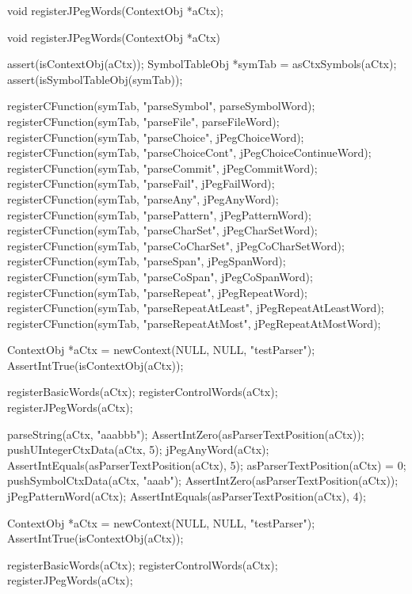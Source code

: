 \startCHeader
void registerJPegWords(ContextObj *aCtx);
\stopCHeader

\startCCode
void registerJPegWords(ContextObj *aCtx) {
  assert(isContextObj(aCtx));
  SymbolTableObj *symTab = asCtxSymbols(aCtx);
  assert(isSymbolTableObj(symTab));
  
  registerCFunction(symTab, "parseSymbol",        parseSymbolWord);
  registerCFunction(symTab, "parseFile",          parseFileWord);
  registerCFunction(symTab, "parseChoice",        jPegChoiceWord);
  registerCFunction(symTab, "parseChoiceCont",    jPegChoiceContinueWord);
  registerCFunction(symTab, "parseCommit",        jPegCommitWord);
  registerCFunction(symTab, "parseFail",          jPegFailWord);
  registerCFunction(symTab, "parseAny",           jPegAnyWord);
  registerCFunction(symTab, "parsePattern",       jPegPatternWord);
  registerCFunction(symTab, "parseCharSet",       jPegCharSetWord);
  registerCFunction(symTab, "parseCoCharSet",     jPegCoCharSetWord);
  registerCFunction(symTab, "parseSpan",          jPegSpanWord);
  registerCFunction(symTab, "parseCoSpan",        jPegCoSpanWord);
  registerCFunction(symTab, "parseRepeat",        jPegRepeatWord);
  registerCFunction(symTab, "parseRepeatAtLeast", jPegRepeatAtLeastWord);
  registerCFunction(symTab, "parseRepeatAtMost",  jPegRepeatAtMostWord);
}
\stopCCode


\startTestSuite[parser]


\startCTest
  ContextObj *aCtx = newContext(NULL, NULL, "testParser");
  AssertIntTrue(isContextObj(aCtx));
  
  registerBasicWords(aCtx);
  registerControlWords(aCtx);
  registerJPegWords(aCtx);

  parseString(aCtx, "aaabbb");
  AssertIntZero(asParserTextPosition(aCtx));
  pushUIntegerCtxData(aCtx, 5);
  jPegAnyWord(aCtx);
  AssertIntEquals(asParserTextPosition(aCtx), 5);
  asParserTextPosition(aCtx) = 0;
  pushSymbolCtxData(aCtx, "aaab");
  AssertIntZero(asParserTextPosition(aCtx));
  jPegPatternWord(aCtx);
  AssertIntEquals(asParserTextPosition(aCtx), 4);
\stopCTest
\stopTestCase


\startCTest
  ContextObj *aCtx = newContext(NULL, NULL, "testParser");
  AssertIntTrue(isContextObj(aCtx));
  
  registerBasicWords(aCtx);
  registerControlWords(aCtx);
  registerJPegWords(aCtx);
  
